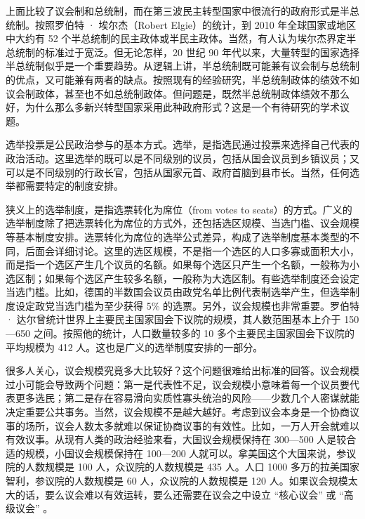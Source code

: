 上面比较了议会制和总统制，而在第三波民主转型国家中很流行的政府形式是半总统制。按照罗伯特 · 埃尔杰（Robert Elgie）的统计，到 2010 年全球国家或地区中大约有 52 个半总统制的民主政体或半民主政体。当然，有人认为埃尔杰界定半总统制的标准过于宽泛。但无论怎样，20 世纪 90 年代以来，大量转型的国家选择半总统制似乎是一个重要趋势。从逻辑上讲，半总统制既可能兼有议会制与总统制的优点，又可能兼有两者的缺点。按照现有的经验研究，半总统制政体的绩效不如议会制政体，甚至也不如总统制政体。但问题是，既然半总统制政体绩效不那么好，为什么那么多新兴转型国家采用此种政府形式？这是一个有待研究的学术议题。


选举投票是公民政治参与的基本方式。选举，是指选民通过投票来选择自己代表的政治活动。这里选举的既可以是不同级别的议员，包括从国会议员到乡镇议员；又可以是不同级别的行政长官，包括从国家元首、政府首脑到县市长。当然，任何选举都需要特定的制度安排。

狭义上的选举制度，是指选票转化为席位（from votes to seats）的方式。广义的选举制度除了把选票转化为席位的方式外，还包括选区规模、当选门槛、议会规模等基本制度安排。选票转化为席位的选举公式差异，构成了选举制度基本类型的不同，后面会详细讨论。这里的选区规模，不是指一个选区的人口多寡或面积大小，而是指一个选区产生几个议员的名额。如果每个选区只产生一个名额，一般称为小选区制；如果每个选区产生较多名额，一般称为大选区制。有些选举制度还会设定当选门槛。比如，德国的半数国会议员由政党名单比例代表制选举产生，但选举制度设定政党当选门槛为至少获得 5\% 的选票。另外，议会规模也非常重要。罗伯特 · 达尔曾统计世界上主要民主国家国会下议院的规模，其人数范围基本上介于 150—650 之间。按照他的统计，人口数量较多的 10 多个主要民主国家国会下议院的平均规模为 412 人。这也是广义的选举制度安排的一部分。

很多人关心，议会规模究竟多大比较好？这个问题很难给出标准的回答。议会规模过小可能会导致两个问题：第一是代表性不足，议会规模小意味着每一个议员要代表更多选民；第二是存在容易滑向实质性寡头统治的风险——少数几个人密谋就能决定重要公共事务。当然，议会规模不是越大越好。考虑到议会本身是一个协商议事的场所，议会人数太多就难以保证协商议事的有效性。比如，一万人开会就难以有效议事。从现有人类的政治经验来看，大国议会规模保持在 300—500 人是较合适的规模，小国议会规模保持在 100—200 人就可以。拿美国这个大国来说，参议院的人数规模是 100 人，众议院的人数规模是 435 人。人口 1000 多万的拉美国家智利，参议院的人数规模是 60 人，众议院的人数规模是 120 人。如果议会规模太大的话，要么议会难以有效运转，要么还需要在议会之中设立 “核心议会” 或 “高级议会” 。

